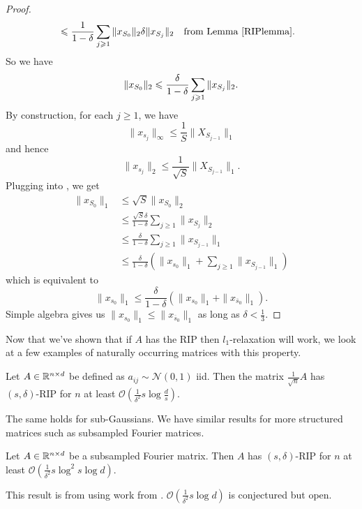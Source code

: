 \begin{proof}
\begin{align*}
                &\le \frac{1}{1 - \delta}\sum\limits_{j \ge 1}\|x_{S_0}\|_2 \delta \|x_{S_j}\|_2 && \text{from Lemma~\ref{RIPlemma}}.
\end{align*}
So we have
\begin{align}
\|x_{S_0}\|_2 \le \frac{\delta}{1 - \delta}\sum\limits_{j \ge 1}\|x_{S_j}\|_2.\equationlabel{l2norm}
\end{align}
By construction, for each $j \ge 1$, we have
\[
\|x_{s_j}\|_\infty \le \frac{1}{S}\|X_{S_{j-1}}\|_1
\]
and hence
\[
\|x_{s_j}\|_2 \le \frac{1}{\sqrt{S}}\|X_{S_{j-1}}\|_1.
\]
Plugging into , we get
\begin{align*}
\|x_{S_0}\|_1 &\le \sqrt{S}\|x_{S_0}\|_2\\
              &\le \frac{\sqrt{S}\delta}{1 - \delta}\sum\limits_{j \ge 1}\|x_{S_j}\|_2\\
              &\le \frac{\delta}{1 - \delta}\sum\limits_{j \ge 1}\|x_{S_{j-1}}\|_1\\
              &\le \frac{\delta}{1 - \delta}(\|x_{s_0}\|_1 + \sum\limits_{j \ge 1}\|x_{S_{j-1}}\|_1)
\end{align*}
which is equivalent to
\[
\|x_{s_0}\|_1 \le \frac{\delta}{1 - \delta}(\|x_{s_0}\|_1 + \|x_{\overline{s}_0}\|_1).
\]
Simple algebra gives us $\|x_{s_0}\|_1 \le \|x_{\overline{s}_0}\|_1$ as long as $\delta < \frac{1}{3}$.
\end{proof}
Now that we've shown that if $A$ has the RIP then $l_1$-relaxation will work, we look at a few examples of naturally occurring matrices with this property.
\begin{theorem}
Let $A \in \R^{n \times d}$ be defined as $a_{ij} \sim \mathcal{N}(0,1)$ iid. Then the matrix $\frac{1}{\sqrt{n}}A$ has $(s, \delta)$-RIP for $n$ at least $\mathcal{O}\left(\frac{1}{\delta^2}s \log{\frac{d}{s}}\right)$.
\end{theorem}
The same holds for sub-Gaussians. We have similar results for more structured matrices such as subsampled Fourier matrices.
\begin{theorem}
Let $A \in \R^{n \times d}$ be a subsampled Fourier matrix. Then $A$ has $(s, \delta)$-RIP for $n$ at least $\mathcal{O}\left(\frac{1}{\delta^2}s \log^2 s\log d\right)$.
\end{theorem}
This result is from \cite{DBLP:journals/corr/HavivR15a} using work from \cite{doi:10.1002/cpa.20227, Bourgain2014, DBLP:journals/tit/CandesT06}. $\mathcal{O}\left(\frac{1}{\delta^2}s\log d\right)$ is conjectured but open.


